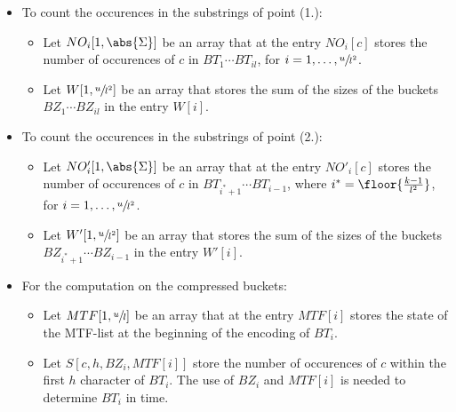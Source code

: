 \documentclass{subfiles}
\begin{document}
        \begin{itemize}
            \item To count the occurences in the substrings of point (1.):
                \begin{itemize}
                    \item Let \(NO_{i}[1, \abs{\Sigma}]\) be an array that at the entry \(NO_{i}[c]\)
                        stores the number of occurences of \(c\) in \(BT_{1}\cdots BT_{il}\), 
                        for \(i = 1, \ldots, \sfrac{u}{l^{2}}\).

                    \item Let \(W[1, \sfrac{u}{l^{2}}]\) be an array that stores the sum of the sizes of 
                        the buckets \(BZ_{1}\cdots BZ_{il}\) in the entry \(W[i]\).
                \end{itemize}

            \item To count the occurences in the substrings of point (2.):
                \begin{itemize}
                    \item Let \(NO'_{i}[1, \abs{\Sigma}]\) be an array that at the entry \(NO'_{i}[c]\)
                        stores the number of occurences of \(c\) in \(BT_{i^{*} + 1}\cdots BT_{i - 1}\), 
                        where \(i^{*} = \floor{\frac{k - 1}{l^{2}}}\), for \(i = 1, \ldots, \sfrac{u}{l^{2}}\).

                    \item Let \(W'[1, \sfrac{u}{l^{2}}]\) be an array that stores the sum of the sizes of 
                        the buckets \(BZ_{i^{*} + 1}\cdots BZ_{i - 1}\) in the entry \(W'[i]\).
                \end{itemize}

            \item For the computation on the compressed buckets:
                \begin{itemize}
                    \item Let \(MTF[1, \sfrac{u}{l}]\) be an array that at the entry \(MTF[i]\)
                        stores the state of the MTF-list at the beginning of the encoding of \(BT_{i}\).

                    \item Let \(S[c, h, BZ_{i}, MTF[i]]\) store the number of occurences of 
                        \(c\) within the first \(h\) character of \(BT_{i}\). 
                        The use of \(BZ_{i}\) and \(MTF[i]\) is needed to determine \(BT_{i}\) in  time.
                \end{itemize}
        \end{itemize}
        
\end{document}
